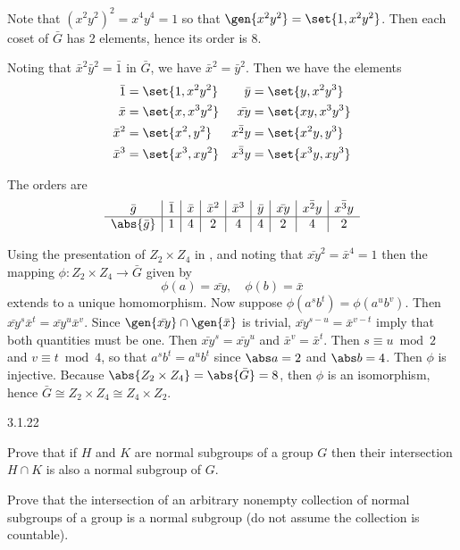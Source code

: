 \begin{solenum}
    \item Note that $(x^2y^2)^2 = x^4y^4 = 1$ so that $\gen{x^2y^2} = \set{1, x^2y^2}$.
	Then each coset of $\bar G$ has 2 elements, hence its order is 8.
    \item Noting that $\bar x^2 \bar y^2 = \bar 1$ in $\bar G$, we have $\bar x^2 = \bar y^2$.
	Then we have the elements
    \begin{align*}
        \bar 1 & = \set{1, x^2y^2} & \bar y & = \set{y, x^2y^3} \\
        \bar x & = \set{x, x^3y^2} & \bar{xy} & = \set{xy, x^3y^3} \\
        \bar x^2 & = \set{x^2, y^2} & \bar{x^2y} & = \set{x^2y, y^3} \\
        \bar x^3 & = \set{x^3, xy^2} & \bar{x^3y} & = \set{x^3y, xy^3}
    \end{align*}
    \item The orders are
    \[
        \begin{array}{c|c|c|c|c|c|c|c|c}
            \bar g & \bar 1 & \bar x & \bar x^2 & \bar x^3 & \bar y & \bar{xy} & \bar{x^2y} & \bar{x^3y} \\
            \hline
            \abs{\bar g} & 1 & 4 & 2 & 4 & 4 & 2 & 4 & 2
        \end{array}
    \]
    \item Using the presentation of $Z_2 \times Z_4$ in , and noting that $\bar{xy}^2 = \bar x^4 = 1$ then the mapping $\phi : Z_2 \times Z_4 \to \bar G$ given by
    \[
    	\phi(a) = \bar{xy}, \quad \phi(b) = \bar x
    \]
    extends to a unique homomorphism.
	Now suppose $\phi(a^sb^t) = \phi(a^ub^v)$.
	Then $\bar{xy}^s\bar x^t = \bar{xy}^u\bar x^v$.
	Since $\gen{\bar{xy}} \cap \gen{\bar x}$ is trivial, $\bar{xy}^{s - u} = \bar x^{v - t}$ imply that both quantities must be one.
	Then $\bar{xy}^s = \bar{xy}^u$ and $\bar x^v = \bar x^t$.
	Then $s \equiv u \bmod 2$ and $v \equiv t \bmod 4$, so that $a^sb^t = a^ub^t$ since $\abs a = 2$ and $\abs b = 4$.
	Then $\phi$ is injective.
	Because $\abs{Z_2 \times Z_4} = \abs{\bar G} = 8$, then $\phi$ is an isomorphism, hence $\bar G \cong Z_2 \times Z_4 \cong Z_4 \times Z_2$.
\end{solenum}

\begin{exercise}{3.1.22}
    \begin{subexercises}
        \item Prove that if $H$ and $K$ are normal subgroups of a group $G$ then their intersection $H \cap K$ is also a normal subgroup of $G$.
        \item Prove that the intersection of an arbitrary nonempty collection of normal subgroups of a group is a normal subgroup (do not assume the collection is countable).
    \end{subexercises}
\end{exercise}

